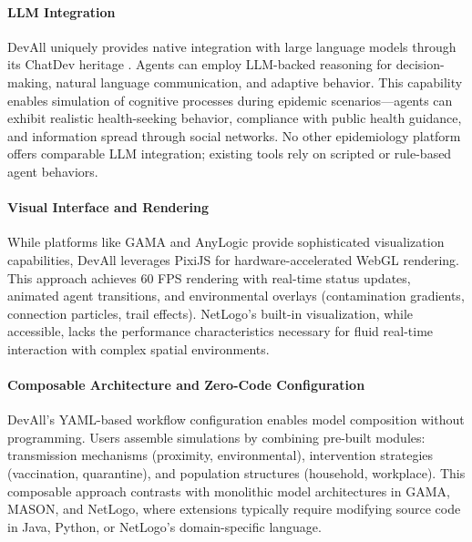 \paragraph{LLM Integration}
DevAll uniquely provides native integration with large language models through its ChatDev heritage \cite{qian2023communicative}. Agents can employ LLM-backed reasoning for decision-making, natural language communication, and adaptive behavior. This capability enables simulation of cognitive processes during epidemic scenarios---agents can exhibit realistic health-seeking behavior, compliance with public health guidance, and information spread through social networks. No other epidemiology platform offers comparable LLM integration; existing tools rely on scripted or rule-based agent behaviors.

\paragraph{Visual Interface and Rendering}
While platforms like GAMA and AnyLogic provide sophisticated visualization capabilities, DevAll leverages PixiJS \cite{pixijs2024documentation} for hardware-accelerated WebGL rendering. This approach achieves 60 FPS rendering with real-time status updates, animated agent transitions, and environmental overlays (contamination gradients, connection particles, trail effects). NetLogo's built-in visualization, while accessible, lacks the performance characteristics necessary for fluid real-time interaction with complex spatial environments.

\paragraph{Composable Architecture and Zero-Code Configuration}
DevAll's YAML-based workflow configuration \cite{gamma1994design} enables model composition without programming. Users assemble simulations by combining pre-built modules: transmission mechanisms (proximity, environmental), intervention strategies (vaccination, quarantine), and population structures (household, workplace). This composable approach contrasts with monolithic model architectures in GAMA, MASON, and NetLogo, where extensions typically require modifying source code in Java, Python, or NetLogo's domain-specific language.

